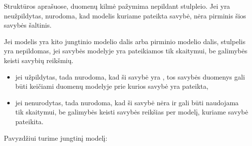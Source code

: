 \documentclass[letterpaper,10pt,lithuanian]{sphinxmanual}
\begin{document}
\sphinxAtStartPar
Struktūros aprašuose, duomenų kilmė pažymima nepildant {\hyperref[\detokenize{dimensijos:property.type}]{}}
stulpleio. Jei {\hyperref[\detokenize{dimensijos:property.type}]{}} yra neužpildytas, nurodoma, kad modelis
kuriame pateikta savybė, nėra pirminis šios savybės šaltinis.

\sphinxAtStartPar
Jei modelis yra kito jungtinio modelio dalis arba pirminio modelio dalis,
{\hyperref[\detokenize{dimensijos:property.type}]{}} stulpelis yra nepildomas, jei savybės modelyje yra
pateikiamos tik skaitymui, be galimybės keisti savybių reikšmių.
\begin{itemize}
\item {} 
\sphinxAtStartPar
jei {\hyperref[\detokenize{dimensijos:property.type}]{}} užpildytas, tada nurodoma, kad ši savybė yra
{\hyperref[\detokenize{savokos:term-pirminis-duomenu-saltinis}]{}}, tos savybės duomenys gali būti keičiami
duomenų modelyje prie kurios savybė yra pateikta,

\item {} 
\sphinxAtStartPar
jei  nenurodytas, tada nurodoma, kad ši savybė nėra {\hyperref[\detokenize{savokos:term-pirminis-duomenu-saltinis}]{}} ir gali būti naudojama tik skaitymui, be galimybės keisti
savybės reikšias per modelį, kuriame savybė pateikita.

\end{itemize}

\sphinxAtStartPar
Pavyzdžiui turime jungtinį  modelį:
\end{document}

